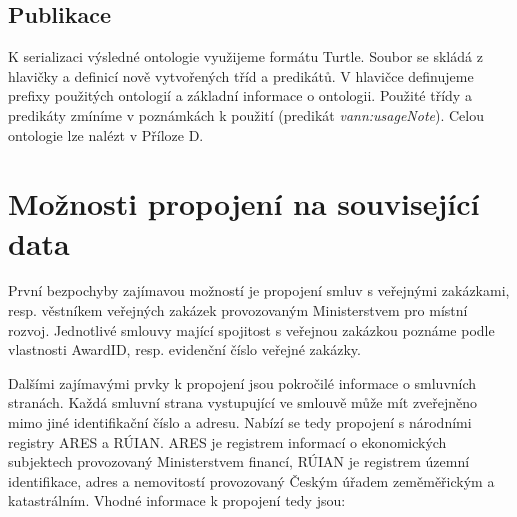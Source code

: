 \subsection{Publikace}
\label{sec:kap423}

K serializaci výsledné ontologie využijeme formátu Turtle. Soubor se skládá z hlavičky a definicí nově vytvořených tříd a predikátů. V hlavičce definujeme prefixy použitých ontologií a základní informace o ontologii. Použité třídy a predikáty zmíníme v poznámkách k použití (predikát \textit{vann:usageNote}). Celou ontologie lze nalézt v Příloze D.

\newpage

\section{Možnosti propojení na související data}

První bezpochyby zajímavou možností je propojení smluv s veřejnými zakázkami, resp. věstníkem veřejných zakázek provozovaným Ministerstvem pro místní rozvoj. Jednotlivé smlouvy mající spojitost s veřejnou zakázkou poznáme podle vlastnosti AwardID, resp. evidenční číslo veřejné zakázky.  

Dalšími zajímavými prvky k propojení jsou pokročilé informace o smluvních stranách. Každá smluvní strana vystupující ve smlouvě může mít zveřejněno mimo jiné identifikační číslo a adresu. Nabízí se tedy propojení s národními registry ARES a RÚIAN. ARES je registrem informací o ekonomických subjektech provozovaný Ministerstvem financí, RÚIAN je registrem územní identifikace, adres a nemovitostí provozovaný Českým úřadem zeměměřickým a katastrálním. Vhodné informace k propojení tedy jsou:

